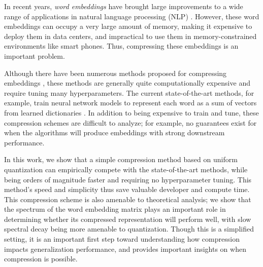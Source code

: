 In recent years, \textit{word embeddings} \citep{word2vec13,glove14,fasttext18} have brought large improvements to a wide range of applications in natural language processing (NLP) \citep{collins16,drqa17}.
However, these word embeddings can occupy a very large amount of memory, making it expensive to deploy them in data centers, and impractical to use them in memory-constrained environments like smart phones.
Thus, compressing these embeddings is an important problem.

Although there have been numerous methods proposed for compressing embeddings \citep{sparse16,andrews16,dccl17,kway18}, these methods are generally quite computationally expensive and require tuning many hyperparameters.
The current state-of-the-art methods, for example, train neural network models to represent each word as a sum of vectors from learned dictionaries \citep{dccl17,kway18}.
In addition to being expensive to train and tune, these compression schemes are difficult to analyze; for example, no guarantees exist for when the algorithms will produce embeddings with strong downstream performance.

In this work, we show that a simple compression method based on uniform quantization can empirically compete with the state-of-the-art methods, while being orders of magnitude faster and requiring no hyperparameter tuning.
This method's speed and simplicity thus save valuable developer and compute time.
This compression scheme is also amenable to theoretical analysis;
we show that the spectrum of the word embedding matrix plays an important role in determining whether its compressed representation will perform well, with slow spectral decay being more amenable to quantization.
Though this is a simplified setting, it is an important first step toward understanding how compression impacts generalization performance, and provides important insights on when compression is possible.

